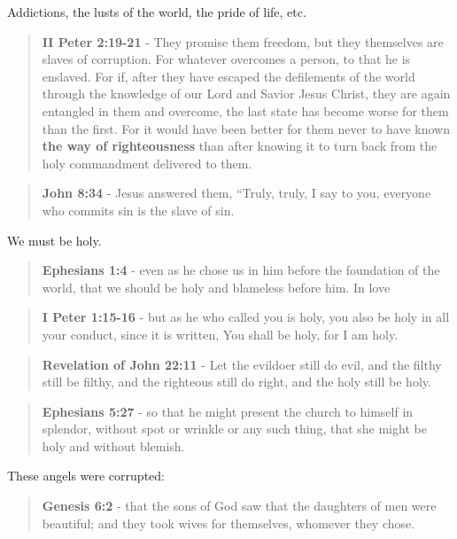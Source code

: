 \documentclass[11pt]{article}
\begin{document}
Addictions, the lusts of the world, the pride of life, etc.

\begin{quote}
\textbf{II Peter 2:19-21} - They promise them freedom, but they themselves are slaves of corruption. For whatever overcomes a person, to that he is enslaved. For if, after they have escaped the defilements of the world through the knowledge of our Lord and Savior Jesus Christ, they are again entangled in them and overcome, the last state has become worse for them than the first. For it would have been better for them never to have known \textbf{the way of righteousness} than after knowing it to turn back from the holy commandment delivered to them.
\end{quote}

\begin{quote}
\textbf{John 8:34} - Jesus answered them, “Truly, truly, I say to you, everyone who commits sin is the slave of sin.
\end{quote}

We must be holy.

\begin{quote}
\textbf{Ephesians 1:4} - even as he chose us in him before the foundation of the world, that we should be holy and blameless before him. In love
\end{quote}

\begin{quote}
\textbf{I Peter 1:15-16} - but as he who called you is holy, you also be holy in all your conduct, since it is written, You shall be holy, for I am holy.
\end{quote}

\begin{quote}
\textbf{Revelation of John 22:11} - Let the evildoer still do evil, and the filthy still be filthy, and the righteous still do right, and the holy still be holy.
\end{quote}

\begin{quote}
\textbf{Ephesians 5:27} - so that he might present the church to himself in splendor, without spot or wrinkle or any such thing, that she might be holy and without blemish.
\end{quote}

These angels were corrupted:

\begin{quote}
\textbf{Genesis 6:2} - that the sons of God saw that the daughters of men were beautiful; and they took wives for themselves, whomever they chose.
\end{quote}
\end{document}
